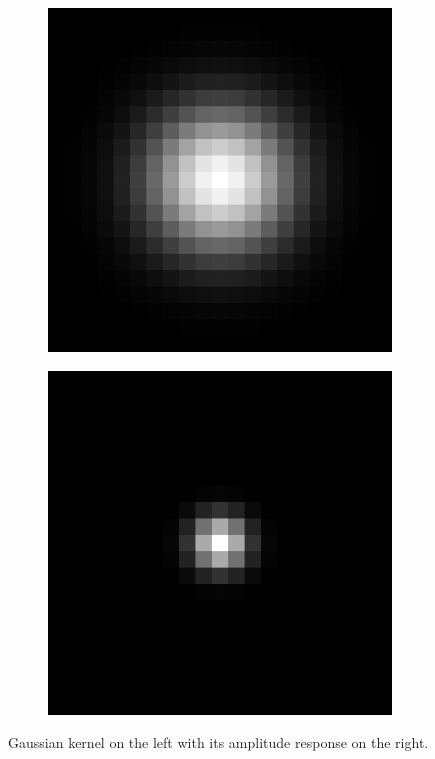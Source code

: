 \documentclass[]{article}
\begin{document}
\begin{figure}
  \label{fig:gaussian-kernel}
  \centering
    \begin{subfigure}[t]{0.49\textwidth}
      \centering
      \includegraphics[width=0.99\linewidth]{kernel.png}
    \end{subfigure}
    \begin{subfigure}[t]{0.49\textwidth}
      \centering
      \includegraphics[width=0.99\linewidth]{freq.png}
    \end{subfigure}
    \caption{Gaussian kernel on the left with its amplitude response on the
    right.}
\end{figure}
\end{document}
